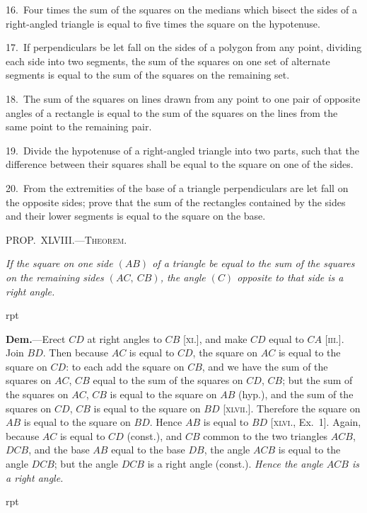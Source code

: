 \documentclass[oneside]{book}
\newcommand\mypropl[2]{
\bigskip\Needspace*{4\baselineskip}\begin{center}\textsc{#1}\end{center}
\hspace{\parindent}\emph{#2}\par\medskip
}
\newcommand\imgflow[3]{
\setcounter{wrapwidth}{#1}
\begin{wrapfigure}[#2]{r}{\value{wrapwidth}pt}
\begin{center}
\vspace{-0.3in}
\end{center}
\end{wrapfigure}
}
\begin{document}
\begin{footnotesize}
16.~Four times the sum of the squares on the medians which
bisect the sides of a right-angled triangle is equal to five times
the square on the hypotenuse.

17.~If perpendiculars be let fall on the sides of a polygon from
any point, dividing each side into two segments, the sum of the
squares on one set of alternate segments is equal to the sum of the
squares on the remaining set.

18.~The sum of the squares on lines drawn from any point to
one pair of opposite angles of a rectangle is equal to the sum of
the squares on the lines from the same point to the remaining
pair.

19.~Divide the hypotenuse of a right-angled triangle into two
parts, such that the difference between their squares shall be
equal to the square on one of the sides.

20.~From the extremities of the base of a triangle perpendiculars
are let fall on the opposite sides; prove that the sum of the
rectangles contained by the sides and their lower segments is
equal to the square on the base.
\par\end{footnotesize}


\mypropl{PROP\@.~XLVIII\@.---Theorem.}{If the square on one side $(AB)$ of a triangle be equal to
the sum of the squares on the remaining sides $(AC,\ CB)$,
the angle $(C)$ opposite to that side is a right angle.}

\imgflow{107}{9}{f070}

\textbf{Dem.}---Erect $CD$ at right angles to $CB$ [\textsc{xi}.], and
make $CD$ equal to $CA$ [\textsc{iii}.]. Join
$BD$. Then because $AC$ is equal
to $CD$, the square on $AC$ is equal
to the square on $CD$: to each add
the square on $CB$, and we have the
sum of the squares on $AC$, $CB$
equal to the sum of the squares
on $CD$, $CB$; but the sum of the
squares on $AC$, $CB$ is equal to the
square on $AB$ (hyp.), and the sum of the squares on
$CD$, $CB$ is equal to the square on $BD$ [\textsc{xlvii}.]. Therefore
the square on $AB$ is equal to the square on $BD$.
Hence $AB$ is equal to $BD$ [\textsc{xlvi}., Ex.~1]. Again, because
$AC$ is equal to $CD$ (const.), and $CB$ common to
the two triangles $ACB$, $DCB$, and the base $AB$ equal
to the base $DB$, the angle $ACB$ is equal to the angle
$DCB$; but the angle $DCB$ is a right angle (const.).
\emph{Hence the angle $ACB$ is a right angle.}\par\medskip


\imgflow{125}{7}{f071}
\end{document}

